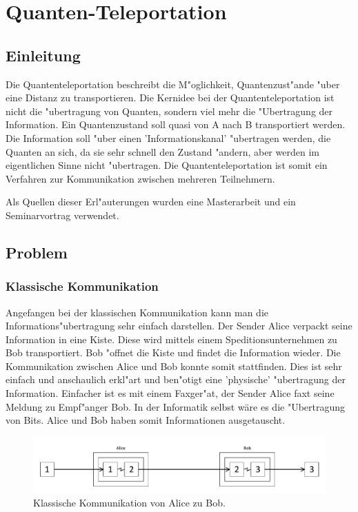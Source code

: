\chapter{Quanten-Teleportation\label{chapter:teleport}}
\begin{refsection}

\section{Einleitung}
Die Quantenteleportation beschreibt die M"oglichkeit, Quantenzust"ande "uber eine Distanz zu transportieren. Die Kernidee bei der Quantenteleportation ist nicht die "ubertragung von Quanten, sondern viel mehr die "Ubertragung der Information. Ein Quantenzustand soll quasi von A nach B transportiert werden. Die Information soll "uber einen 'Informationskanal' "ubertragen werden, die Quanten an sich, da sie sehr schnell den Zustand "andern, aber werden im eigentlichen Sinne nicht "ubertragen. Die Quantenteleportation ist somit ein Verfahren zur Kommunikation zwischen mehreren Teilnehmern.

Als Quellen dieser Erl"auterungen wurden eine Masterarbeit \cite{teleport:mscthesis} und ein Seminarvortrag \cite{teleport:teleport-seminar} verwendet.
\section{Problem}
\subsection{Klassische Kommunikation}
Angefangen bei der klassischen Kommunikation kann man die Informations"ubertragung sehr einfach darstellen. Der Sender Alice verpackt seine Information in eine Kiste. Diese wird mittels einem Speditionsunternehmen zu Bob transportiert. Bob "offnet die Kiste und findet die Information wieder. Die Kommunikation zwischen Alice und Bob konnte somit stattfinden. Dies ist sehr einfach und anschaulich erkl"art und ben"otigt eine 'physische' "ubertragung der Information. Einfacher ist es mit einem Faxger"at, der Sender Alice faxt seine Meldung zu Empf"anger Bob. In der Informatik selbst wäre es die "Ubertragung von Bits. Alice und Bob haben somit Informationen ausgetauscht.
\begin{figure}
\center
\includegraphics[width=1\textwidth]{teleport/image/classic_com.pdf}
\caption{Klassische Kommunikation von Alice zu Bob.}
\label{Klassische Kommunikation}
\end{figure}

\end{refsection}
